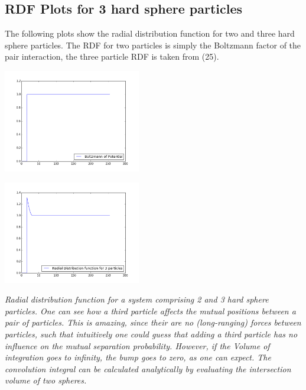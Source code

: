 \documentclass[11pt,a4paper]{article}
\begin{document}
\subsection{RDF Plots for 3 hard sphere particles }
The following plots show the radial distribution function for two and three hard sphere particles. The RDF for two particles
is simply the Boltzmann factor of the pair interaction, the three particle RDF is taken from (25).
\begin{minipage}[hbt]{5cm}
	\centering
	\includegraphics[width=6cm]{rdfHS2P.png}
\end{minipage}
\hfill
\begin{minipage}[hbt]{5cm}
	\centering
	\includegraphics[width=6cm]{rdfHS3P.png}
\end{minipage}
\newline
\textit{Radial distribution function for a system comprising 2 and 3 hard sphere particles. 
One can see how a third particle affects the mutual positions between a pair of particles. 
This is amazing, since their are no (long-ranging) forces between particles, such that intuitively one could
guess that adding a third particle has no influence on the mutual separation probability. 
However, if the Volume of integration goes to infinity, the bump goes to zero, as one can expect. \newline
The convolution integral can be calculated analytically by evaluating the intersection volume of two spheres.
}
\newpage
\end{document}
